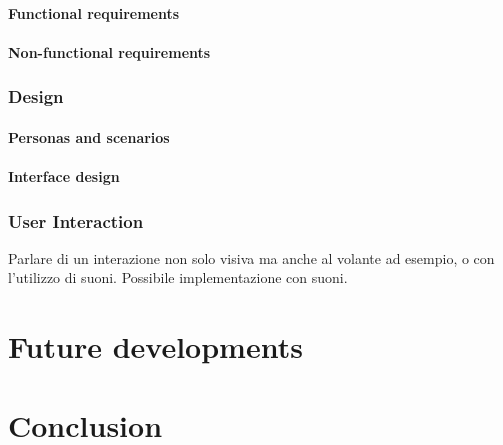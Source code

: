 \documentclass[a4paper,final,12pt]{report}
\begin{document}
\subsubsection{Functional requirements}

\subsubsection{Non-functional requirements}

\subsection{Design}

\subsubsection{Personas and scenarios}

\subsubsection{Interface design}

\subsection{User Interaction}
Parlare di un interazione non solo visiva ma anche al volante ad esempio, o con l'utilizzo di suoni. Possibile implementazione con suoni.

\chapter{Future developments}

\chapter{Conclusion}



































\end{document}
